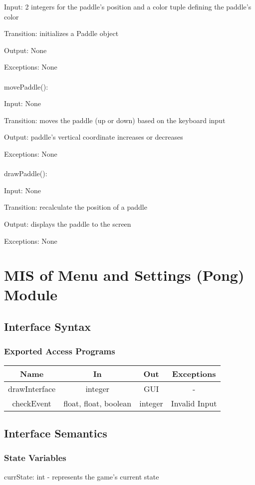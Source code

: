 \documentclass[12pt, titlepage]{article}
\begin{document}
		Input: 2 integers for the paddle's position and a color tuple defining the paddle's color
		
		Transition: initializes a Paddle object
		
		Output: None
		
		Exceptions: None\\
		\\
		movePaddle():
		
		Input: None
		
		Transition: moves the paddle (up or down) based on the keyboard input
		
		Output: paddle's vertical coordinate increases or decreases
		
		Exceptions: None\\
		\\
    	drawPaddle():
		
		Input: None
		
		Transition: recalculate the position of a paddle
		
		Output: displays the paddle to the screen
		
		Exceptions: None
		
\section{MIS of Menu and Settings (Pong) Module}
		\subsection{Interface Syntax}
		\subsubsection{Exported Access Programs}
		\begin{tabular}[pos]{|c|c|c|c|}
			\hline
			\textbf{Name}& \textbf{In} & \textbf{Out} & \textbf{Exceptions} \\ \hline
			drawInterface & integer & GUI & - \\ \hline
			checkEvent & float, float, boolean & integer & Invalid Input \\ \hline
			
		\end{tabular}
		
		\subsection{Interface Semantics}
		\subsubsection{State Variables}
		currState: int - represents the game's current state
		
\end{document}

